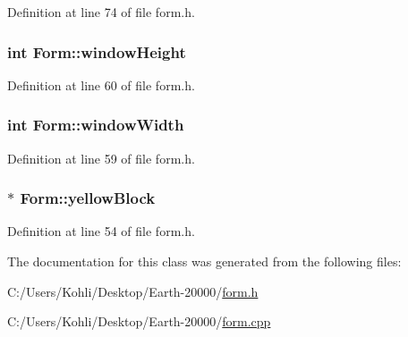Definition at line 74 of file form.h.\hypertarget{class_form_addbe1e71147359d087fa7f66ea4aec50}{
\subsubsection[{windowHeight}]{\setlength{\rightskip}{0pt plus 5cm}int {\bf Form::windowHeight}}}
\label{class_form_addbe1e71147359d087fa7f66ea4aec50}


Definition at line 60 of file form.h.\hypertarget{class_form_a0f3a6be75fa8dcc00127c1d735f5d650}{
\subsubsection[{windowWidth}]{\setlength{\rightskip}{0pt plus 5cm}int {\bf Form::windowWidth}}}
\label{class_form_a0f3a6be75fa8dcc00127c1d735f5d650}


Definition at line 59 of file form.h.\hypertarget{class_form_a2e1c5906b9ba37321cb7bab858d895fa}{
\subsubsection[{yellowBlock}]{$\ast$ {\bf Form::yellowBlock}}}
\label{class_form_a2e1c5906b9ba37321cb7bab858d895fa}


Definition at line 54 of file form.h.

The documentation for this class was generated from the following files:\begin{DoxyCompactItemize}
\item 
C:/Users/Kohli/Desktop/Earth-\/20000/\hyperlink{form_8h}{form.h}\item 
C:/Users/Kohli/Desktop/Earth-\/20000/\hyperlink{form_8cpp}{form.cpp}\end{DoxyCompactItemize}
